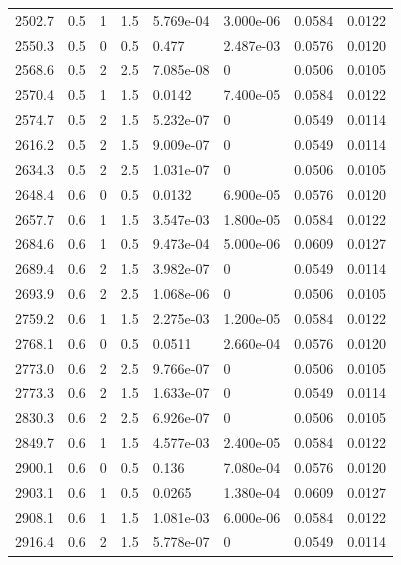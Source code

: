 \documentclass[preview]{standalone}
\begin{document}
{{{\begin{tabular}{L{1.2cm}C{1.2cm} C{0.3cm}C{0.5cm} C{1.4cm}C{1.4cm} C{1.4cm}C{1.4cm}}
  2502.7  &   0.5  & 1     & 1.5 &  5.769e-04  & 3.000e-06  & 0.0584 &  0.0122   \\ 
  2550.3  &   0.5  & 0     & 0.5 &  0.477  & 2.487e-03  & 0.0576 &  0.0120   \\ 
  2568.6  &   0.5  & 2     & 2.5 &  7.085e-08  & 0  & 0.0506 &  0.0105   \\ 
  2570.4  &   0.5  & 1     & 1.5 &  0.0142  & 7.400e-05  & 0.0584 &  0.0122   \\ 
  2574.7  &   0.5  & 2     & 1.5 &  5.232e-07  & 0  & 0.0549 &  0.0114   \\ 
  2616.2  &   0.5  & 2     & 1.5 &  9.009e-07  & 0  & 0.0549 &  0.0114   \\ 
  2634.3  &   0.5  & 2     & 2.5 &  1.031e-07  & 0  & 0.0506 &  0.0105   \\ 
  2648.4  &   0.6  & 0     & 0.5 &  0.0132  & 6.900e-05  & 0.0576 &  0.0120   \\ 
  2657.7  &   0.6  & 1     & 1.5 &  3.547e-03  & 1.800e-05  & 0.0584 &  0.0122   \\ 
  2684.6  &   0.6  & 1     & 0.5 &  9.473e-04  & 5.000e-06  & 0.0609 &  0.0127   \\ 
  2689.4  &   0.6  & 2     & 1.5 &  3.982e-07  & 0  & 0.0549 &  0.0114   \\ 
  2693.9  &   0.6  & 2     & 2.5 &  1.068e-06  & 0  & 0.0506 &  0.0105   \\ 
  2759.2  &   0.6  & 1     & 1.5 &  2.275e-03  & 1.200e-05  & 0.0584 &  0.0122   \\ 
  2768.1  &   0.6  & 0     & 0.5 &  0.0511  & 2.660e-04  & 0.0576 &  0.0120   \\ 
  2773.0  &   0.6  & 2     & 2.5 &  9.766e-07  & 0  & 0.0506 &  0.0105   \\ 
  2773.3  &   0.6  & 2     & 1.5 &  1.633e-07  & 0  & 0.0549 &  0.0114   \\ 
  2830.3  &   0.6  & 2     & 2.5 &  6.926e-07  & 0  & 0.0506 &  0.0105   \\ 
  2849.7  &   0.6  & 1     & 1.5 &  4.577e-03  & 2.400e-05  & 0.0584 &  0.0122   \\ 
  2900.1  &   0.6  & 0     & 0.5 &  0.136  & 7.080e-04  & 0.0576 &  0.0120   \\ 
  2903.1  &   0.6  & 1     & 0.5 &  0.0265  & 1.380e-04  & 0.0609 &  0.0127   \\ 
  2908.1  &   0.6  & 1     & 1.5 &  1.081e-03  & 6.000e-06  & 0.0584 &  0.0122   \\ 
  2916.4  &   0.6  & 2     & 1.5 &  5.778e-07  & 0  & 0.0549 &  0.0114   \\ 

\end{tabular}}}}
\end{document}
